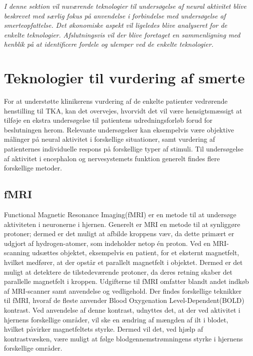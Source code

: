 \textit{I denne sektion vil nuværende teknologier til undersøgelse af neural aktivitet blive beskrevet med særlig fokus på anvendelse i forbindelse med undersøgelse af smerteopfattelse. Det økonomiske aspekt vil ligeledes blive analyseret for de enkelte teknologier. Afslutningsvis vil der blive foretaget en sammenligning med henblik på at identificere fordele og ulemper ved de enkelte teknologier.}
\section{Teknologier til vurdering af smerte} %
For at understøtte klinikerens vurdering af de enkelte patienter vedrørende henstilling til TKA, kan det overvejes, hvorvidt det vil være hensigtsmæssigt at tilføje en ekstra undersøgelse til patientens udredningsforløb forud for beslutningen herom. Relevante undersøgelser kan eksempelvis være objektive målinger på neural aktivitet i forskellige situationer, samt vurdering af patienternes individuelle respons på forskellige typer af stimuli. Til undersøgelse af aktivitet i encephalon og nervesystemets funktion generelt findes flere forskellige metoder.
  
\subsection{fMRI}
Functional Magnetic Resonance Imaging(fMRI) er en metode til at undersøge aktiviteten i neuronerne i hjernen.
Generelt er MRI en metode til at synliggøre protoner; dermed er det muligt at afbilde kroppens væv, da dette primært er udgjort af hydrogen-atomer, som indeholder netop én proton.     
Ved en MRI-scanning udsættes objektet, eksempelvis en patient, for et eksternt magnetfelt, hvilket medfører, at der opstår et parallelt magnetfelt i objektet. Dermed er det muligt at detektere de tilstedeværende protoner, da deres retning skaber det parallelle magnetfelt i kroppen.\citep{Wals2009} Udgifterne til fMRI omfatter blandt andet indkøb af MRI-scanner samt anvendelse og vedligehold. 
Der findes forskellige teknikker til fMRI, hvoraf de fleste anvender Blood Oxygenation Level-Dependent(BOLD) kontrast. Ved anvendelse af denne kontrast, udnyttes det, at der ved aktivitet i hjernens forskellige områder, vil ske en ændring af mængden af ilt i blodet, hvilket påvirker magnetfeltets styrke. Dermed vil det, ved hjælp af kontrastvæsken, være muligt at følge blodgennemstrømningens styrke i hjernens forskellige områder. \citep{Wals2009} 

